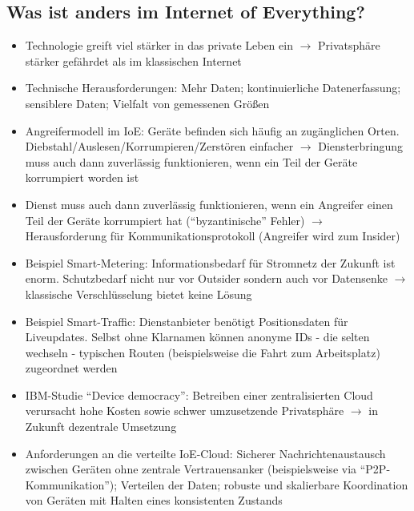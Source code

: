 \subsection{Was ist anders im Internet of Everything?}
\begin{itemize}
	\item Technologie greift viel stärker in das private Leben ein \(\rightarrow\) Privatsphäre stärker gefährdet als im klassischen Internet
	\item Technische Herausforderungen: Mehr Daten; kontinuierliche Datenerfassung; sensiblere Daten; Vielfalt von gemessenen Größen
	\item Angreifermodell im IoE: Geräte befinden sich häufig an zugänglichen Orten. Diebstahl/Auslesen/Korrumpieren/Zerstören einfacher \(\rightarrow\) Diensterbringung muss auch dann zuverlässig funktionieren, wenn ein Teil der Geräte korrumpiert worden ist
	\item Dienst muss auch dann zuverlässig funktionieren, wenn ein Angreifer einen Teil der Geräte korrumpiert hat ("`byzantinische"' Fehler) \(\rightarrow\) Herausforderung für Kommunikationsprotokoll (Angreifer wird zum Insider)
	\item Beispiel Smart-Metering: Informationsbedarf für Stromnetz der Zukunft ist enorm. Schutzbedarf nicht nur vor Outsider sondern auch vor Datensenke \(\rightarrow\) klassische Verschlüsselung bietet keine Lösung
	\item Beispiel Smart-Traffic: Dienstanbieter benötigt Positionsdaten für Liveupdates. Selbst ohne Klarnamen können anonyme IDs - die selten wechseln - typischen Routen (beispielsweise die Fahrt zum Arbeitsplatz) zugeordnet werden
	\item IBM-Studie "`Device democracy"': Betreiben einer zentralisierten Cloud verursacht hohe Kosten sowie schwer umzusetzende Privatsphäre \(\rightarrow\) in Zukunft dezentrale Umsetzung
	\item Anforderungen an die verteilte IoE-Cloud: Sicherer Nachrichtenaustausch zwischen Geräten ohne zentrale Vertrauensanker (beispielsweise via "`P2P-Kommunikation"'); Verteilen der Daten; robuste und skalierbare Koordination von Geräten mit Halten eines konsistenten Zustands
\end{itemize}


